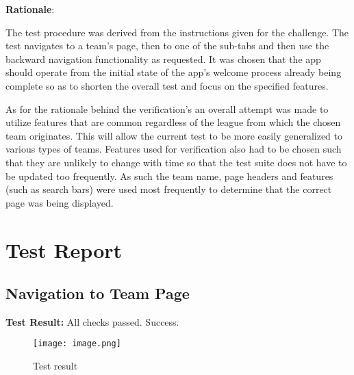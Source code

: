 \documentclass{article}
\begin{document}
\noindent\textbf{Rationale}:

The test procedure was derived from the instructions given for the challenge. The test navigates to a team's page, then to one of the sub-tabs and then use the backward navigation functionality as requested. It was chosen that the app should operate from the initial state of the app's welcome process already being complete so as to shorten the overall test and focus on the specified features. 

As for the rationale behind the verification's an overall attempt was made to utilize features that are common regardless of the league from which the chosen team originates. This will allow the current test to be more easily generalized to various types of teams. Features used for verification also had to be chosen such that they are unlikely to change with time so that the test suite does not have to be updated too frequently. As such the team name, page headers and features (such as search bars) were used most frequently to determine that the correct page was being displayed.

\section{Test Report}
\subsection{Navigation to Team Page}
\textbf{Test Result:} All checks passed. Success.
\begin{figure}[!h]
    \centering
    \texttt{[image: image.png]}
    \caption{Test result}
    \label{fig:enter-label}
\end{figure}
\end{document}

